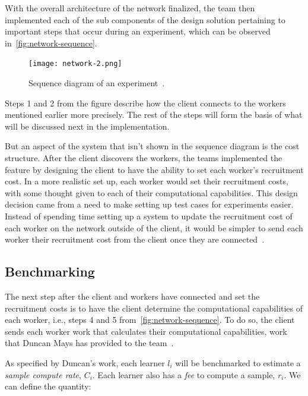 \documentclass[../mthe-493-final-project.tex]{subfiles}
\begin{document}
    With the overall architecture of the network finalized, the team then implemented each of the sub components of the design solution pertaining to important steps that occur during an experiment, which can be observed in~\autoref{fig:network-sequence}.

    \begin{figure}
        \texttt{[image: network-2.png]}
        \caption{Sequence diagram of an experiment~\cite{group_a2_Optimization_Of_Data}.}
        \label{fig:network-sequence}
    \end{figure}

    Steps 1 and 2 from the figure describe how the client connects to the workers mentioned earlier more precisely. The rest of the steps will form the basis of what will be discussed next in the implementation.

    But an aspect of the system that isn't shown in the sequence diagram is the cost structure. After the client discovers the workers, the teams implemented the feature by designing the client to have the ability to set each worker's recruitment cost. In a more realistic set up, each worker would set their recruitment costs, with some thought given to each of their computational capabilities. This design decision came from a need to make setting up test cases for experiments easier. Instead of spending time setting up a system to update the recruitment cost of each worker on the network outside of the client, it would be simpler to send each worker their recruitment cost from the client once they are connected~\cite{group_a2_Optimization_Of_Data}. 

    \subsection{Benchmarking}
    \label{ssec:benchmarking}

    The next step after the client and workers have connected and set the recruitment costs is to have the client determine the computational capabilities of each worker, i.e., steps 4 and 5 from~\autoref{fig:network-sequence}. To do so, the client sends each worker work that calculates their computational capabilities, work that Duncan Mays has provided to the team~\cite{mays_benchmark_nodate}.

    As specified by Duncan's work, each learner $l_i$ will be benchmarked to estimate a \textit{sample compute rate}, $C_i$. Each learner also has a \textit{fee} to compute a sample, $r_i$. We can define the quantity:
    
\end{document}
